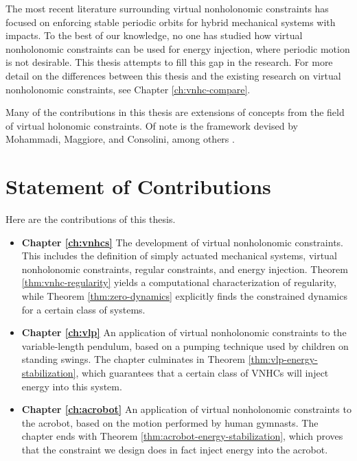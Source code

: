 The most recent literature surrounding virtual nonholonomic constraints
has focused on enforcing stable periodic orbits for hybrid mechanical systems
with impacts.
To the best of our knowledge, no one has studied how virtual nonholonomic
constraints can be used for energy injection, where periodic motion is not
desirable.
This thesis attempts to fill this gap in the research.
For more detail on the differences between this thesis and the existing research
on virtual nonholonomic constraints, see Chapter \ref{ch:vnhc-compare}.

Many of the contributions in this thesis are extensions of concepts from the
field of virtual holonomic constraints. 
Of note is the framework devised by Mohammadi, Maggiore, and
Consolini, among others
\cite{vhcs_for_el_systems,dynamic_vhcs_stabilize_closed_orbits,lagrangian_structure_reduced_dynamics_vhcs,xingbo_thesis}.

\section{Statement of Contributions}
Here are the contributions of this thesis.
\begin{itemize}[label={}]
   \item \textbf{Chapter \ref{ch:vnhcs}} The development of 
      virtual nonholonomic constraints.
      This includes the definition of simply actuated mechanical systems, virtual
      nonholonomic constraints, regular constraints, and energy injection.
      Theorem \ref{thm:vnhc-regularity} yields a computational characterization
      of regularity, while Theorem \ref{thm:zero-dynamics} explicitly finds the
      constrained dynamics for a certain class of systems.
   \item \textbf{Chapter \ref{ch:vlp}} An application of virtual nonholonomic
      constraints to the variable-length pendulum, based on a pumping technique
      used by children on standing swings.
      The chapter culminates in Theorem \ref{thm:vlp-energy-stabilization},
      which guarantees that a certain class of VNHCs will inject energy into
      this system.
   \item \textbf{Chapter \ref{ch:acrobot}} An application of virtual
      nonholonomic constraints to the acrobot, based on the motion performed by
      human gymnasts.
      The chapter ends with Theorem \ref{thm:acrobot-energy-stabilization},
      which proves that the constraint we design does in fact inject energy into
      the acrobot.
\end{itemize}


